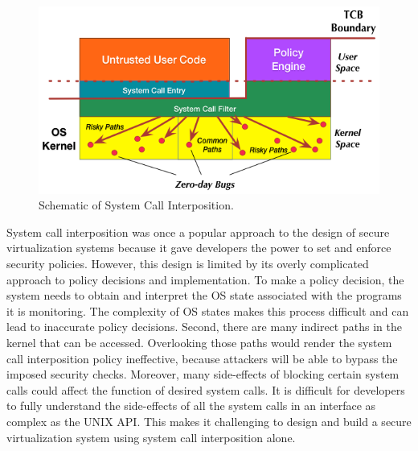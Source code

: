 \begin{figure}%
\centering
\includegraphics[width=1.0\columnwidth]{diagram/Virtualization_Design_Model_03.png}
\caption{\small Schematic of System Call Interposition.}
\label{fig:design_system_call_interposition}
\end{figure}  

System call interposition was once a popular approach to the design of secure
virtualization systems because it gave developers the power to set and enforce
security policies. 
However, this design
is limited by its overly complicated approach to policy decisions and implementation.
To make a policy decision, the system needs to
obtain and interpret the OS state associated with the programs it is monitoring.
 The
complexity of OS states makes this process difficult and can lead to
inaccurate policy decisions.
Second, there are many indirect paths in the kernel that can be accessed.
Overlooking those paths would render the
system call interposition policy ineffective, because attackers will be able to
bypass the imposed security checks.
Moreover, many side-effects of blocking
certain system calls could affect the function of desired system calls.
It is difficult for developers to fully understand the side-effects of all the
system calls in an interface as complex as the UNIX API.  This makes
it challenging to design and build a secure virtualization system using
system call interposition alone.

